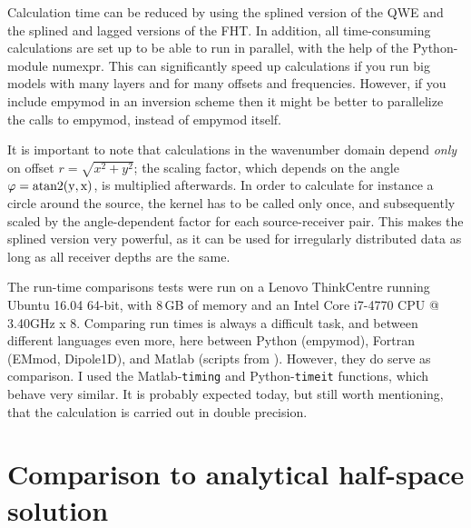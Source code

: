 \documentclass[manuscript,revised]{geophysics}
\begin{document}
Calculation time can be reduced by using the splined version of the QWE and the
splined and lagged versions of the FHT. In addition, all time-consuming
calculations are set up to be able to run in parallel, with the help of the
Python-module numexpr. This can significantly speed up calculations if you run
big models with many layers and for many offsets and frequencies. However, if
you include empymod in an inversion scheme then it might be better to
parallelize the calls to empymod, instead of empymod itself.

It is important to note that calculations in the wavenumber domain depend
\emph{only} on offset $r = \sqrt{x^2+y^2}$; the scaling factor, which depends
on the angle $\varphi = \rm{atan2}(y, x)$, is multiplied afterwards. In order
to calculate for instance a circle around the source, the kernel has to be
called only once, and subsequently scaled by the angle-dependent factor for
each source-receiver pair. This makes the splined version very powerful, as it
can be used for irregularly distributed data as long as all receiver depths are
the same.

The run-time comparisons tests were run on a Lenovo ThinkCentre running Ubuntu
16.04 64-bit, with 8\,GB of memory and an Intel Core i7-4770 CPU @ 3.40GHz x 8.
Comparing run times is always a difficult task, and between different languages
even more, here between Python (empymod), Fortran (EMmod, Dipole1D), and Matlab
(scripts from \cite{GEO.12.Key}). However, they do serve as comparison. I
used the Matlab-\texttt{timing} and Python-\texttt{timeit} functions, which
behave very similar. It is probably expected today, but still worth mentioning,
that the calculation is carried out in double precision.

\section{Comparison to analytical half-space solution}
\end{document}

